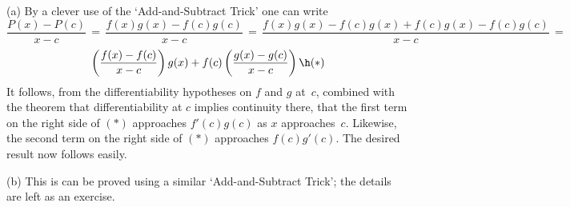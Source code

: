 \V

        (a) By a clever use of the `Add-and-Subtract Trick' one can write
        \begin{displaymath}
        \frac{P(x)-P(c)}{x-c} \,=\, \frac{f(x)g(x)-f(c)g(c)}{x-c} \,=\, \frac{f(x)g(x) - f(c)g(x) + f(c)g(x) - f(c)g(c)}{x-c}
    \,=\,
        \end{displaymath}
        \begin{displaymath}
        \left(\frac{f(x)-f(c)}{x-c}\right)g(x) + f(c)\left(\frac{g(x)-g(c)}{x-c}\right) \h ({\ast})
        \end{displaymath}
    It follows, from the differentiability hypotheses on $f$ and $g$ at~$c$, combined with the theorem that differentiability at $c$ implies continuity there,
    that the first term on the right side of $({\ast})$ approaches $f'(c)g(c)$ as $x$ approaches~$c$.
    Likewise, the second term on the right side of $({\ast})$ approaches $f(c)g'(c)$. The desired result now follows easily.


\V

        (b) This is can be proved using a similar `Add-and-Subtract Trick'; the details are left as an exercise. \Q %

\V

